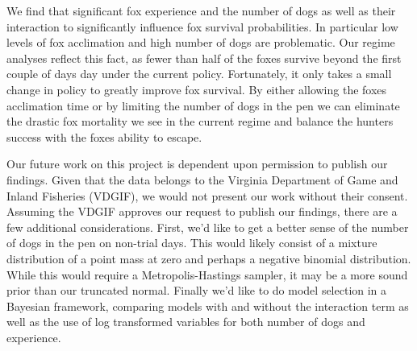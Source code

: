 \documentclass[aoas,preprint]{imsart}
\numberwithin{equation}{section}
\theoremstyle{plain}
\begin{document}
We find that significant fox experience and the number of dogs as well as their interaction to significantly influence fox survival probabilities. In particular low levels of fox acclimation and high number of dogs are problematic. Our regime analyses reflect this fact, as fewer than half of the foxes survive beyond the first couple of days day under the current policy. Fortunately, it only takes a small change in policy to greatly improve fox survival. By either allowing the foxes acclimation time or by limiting the number of dogs in the pen we can eliminate the drastic fox mortality we see in the current regime and balance the hunters success with the foxes ability to escape.

Our future work on this project is dependent upon permission to publish our findings. Given that the data belongs to the Virginia Department of Game and Inland Fisheries (VDGIF), we would not present our work without their consent. Assuming the VDGIF approves our request to publish our findings, there are a few additional considerations. First, we'd like to get a better sense of the number of dogs in the pen on non-trial days. This would likely consist of a mixture distribution of a point mass at zero and perhaps a negative binomial distribution. While this would require a Metropolis-Hastings sampler, it may be a more sound prior than our truncated normal. Finally we'd like to do model selection in a Bayesian framework, comparing models with and without the interaction term as well as the use of log transformed variables for both number of dogs and experience.



%
%
%
\end{document}
